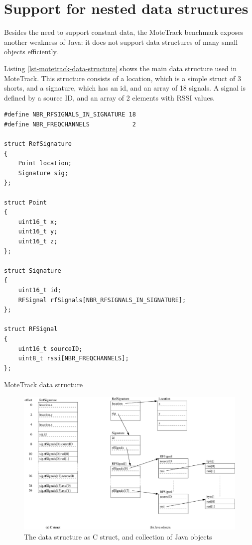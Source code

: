 \section{Support for nested data structures}
\label{sec-nested-data}
Besides the need to support constant data, the MoteTrack benchmark exposes another weakness of Java: it does not support data structures of many small objects efficiently.

Listing \ref{lst-motetrack-data-structure} shows the main  data structure used in MoteTrack. This structure consists of a location, which is a simple struct of 3 shorts, and a signature, which has an id, and an array of 18 signals. A signal is defined by a source ID, and an array of 2 elements with RSSI values.

\begin{listing}[H]
\small
\centering
\begin{verbatim}
#define NBR_RFSIGNALS_IN_SIGNATURE 18
#define NBR_FREQCHANNELS            2

struct RefSignature
{
    Point location;
    Signature sig;
};

struct Point
{
    uint16_t x;
    uint16_t y;
    uint16_t z;
};

struct Signature
{
    uint16_t id;
    RFSignal rfSignals[NBR_RFSIGNALS_IN_SIGNATURE];
};

struct RFSignal
{
    uint16_t sourceID;
    uint8_t rssi[NBR_FREQCHANNELS];
};
\end{verbatim}
\caption{MoteTrack  data structure}
\label{lst-motetrack-data-structure}
\end{listing}

\begin{figure}[]
  \centering
  \includegraphics[width=0.9\linewidth]{motetrack-refsignature-objects}
  \caption{The  data structure as C struct, and collection of Java objects}
  \label{fig-motetrack-refsignature-objects}
\end{figure}

